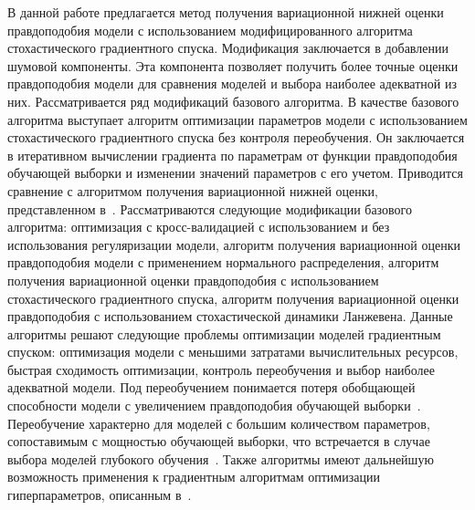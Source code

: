 \documentclass[12pt]{a&t}
\begin{document}


В данной работе предлагается метод получения вариационной нижней оценки  правдоподобия модели с использованием модифицированного алгоритма стохастического градиентного спуска. {Модификация заключается в добавлении шумовой компоненты. Эта компонента позволяет получить более точные оценки правдоподобия модели для сравнения моделей и выбора наиболее адекватной из них. } Рассматривается ряд модификаций базового алгоритма. {В качестве базового алгоритма выступает алгоритм оптимизации параметров модели с использованием стохастического градиентного спуска без контроля переобучения. Он заключается в итеративном вычислении градиента по параметрам от функции правдоподобия обучающей выборки и изменении значений параметров с его учетом.} Приводится сравнение с алгоритмом получения вариационной нижней оценки, представленном в~\cite{nips}. {Рассматриваются следующие модификации базового алгоритма:
оптимизация с кросс-валидацией с использованием и без использования регуляризации модели,
алгоритм получения вариационной оценки правдоподобия модели с применением нормального распределения,
алгоритм получения вариационной оценки правдоподобия с использованием стохастического градиентного спуска,
алгоритм получения вариационной оценки правдоподобия с использованием стохастической динамики Ланжевена.}
 { Данные алгоритмы решают следующие проблемы оптимизации моделей  градиентным спуском: оптимизация модели с меньшими затратами вычислительных ресурсов, быстрая сходимость оптимизации, контроль переобучения и выбор наиболее адекватной модели.
Под переобучением понимается потеря обобщающей способности модели с увеличением правдоподобия обучающей выборки~\cite{MacKay}. Переобучение характерно для моделей с большим количеством параметров, сопоставимым с мощностью обучающей выборки, что встречается в случае выбора моделей глубокого обучения~\cite{hinton_rbm, suts}.
}
Также алгоритмы имеют дальнейшую возможность применения к градиентным алгоритмам оптимизации гиперпараметров, описанным в~\cite{hyper}.
\end{document}
